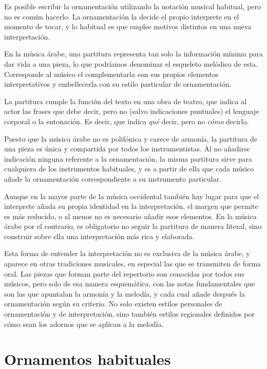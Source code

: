 Es posible escribir la ornamentación utilizando la notación musical habitual, pero no es común hacerlo. La ornamentación la decide el propio interprete en el momento de tocar, y lo habitual es que emplee motivos distintos en una nueva interpretación.

En la música árabe, una partitura representa tan solo la información mínima para dar vida a una pieza, lo que podríamos denominar el esqueleto melódico de esta. Corresponde al músico el complementarla con sus propios elementos interpretativos y embellecerla con su estilo particular de ornamentación.

La partitura cumple la función del texto en una obra de teatro, que indica al actor las frases que debe decir, pero no (salvo indicaciones puntuales) el lenguaje corporal o la entonación. Es decir, que indica \emph{qué} decir, pero no \emph{cómo} decirlo.

Puesto que la música árabe no es polifónica y carece de armonía, la partitura de una pieza es única y compartida por todos los instrumentistas. Al no añadirse indicación ninguna referente a la ornamentación, la misma partitura sirve para cualquiera de los instrumentos habituales, y es a partir de ella que cada músico añade la ornamentación correspondiente a su instrumento particular.

Aunque en la mayor parte de la música occidental también hay lugar para que el interprete añada su propia identidad en la interpretación, el margen que permite es más reducido, o al menos no es necesario añadir esos elementos. En la música árabe por el contrario, es obligatorio no seguir la partitura de manera literal, sino construir sobre ella una interpretación más rica y elaborada.

Esta forma de entender la interpretación no es exclusiva de la música árabe, y aparece en otras tradiciones musicales, en especial las que se transmiten de forma oral. Las piezas que forman parte del repertorio son conocidas por todos sus músicos, pero solo de esa manera esquemática, con las notas fundamentales que son las que apuntalan la armonía y la melodía, y cada cual añade después la ornamentación según su criterio. No solo existen estilos personales de ornamentación y de interpretación, sino también estilos regionales definidos por cómo sean los adornos que se aplican a la melodía.

\section{Ornamentos habituales}

